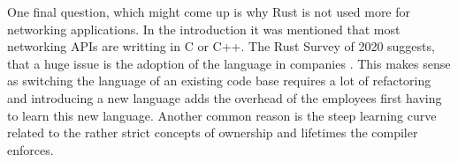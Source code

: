 One final question, which might come up is why Rust is not used more for networking applications. In the introduction
it was mentioned that most networking APIs are writting in C or C++. The Rust Survey of 2020 suggests, that a huge
issue is the adoption of the language in companies \cite{rust-survey}. This makes sense as switching the language of an
existing code base requires a lot of refactoring and introducing a new language adds the overhead of the employees
first having to learn this new language. Another common reason is the steep learning curve related to the rather strict
concepts of ownership and lifetimes the compiler enforces.
